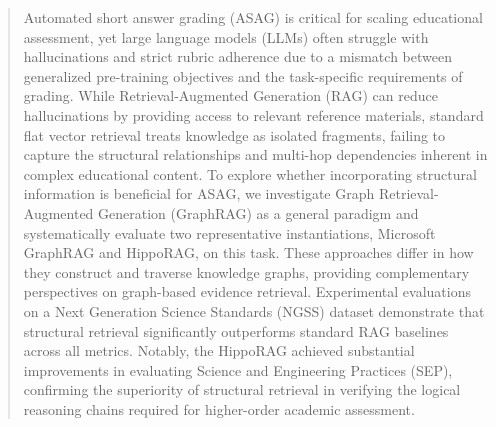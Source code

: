 \documentclass{edm_article}
\begin{document}
\maketitle

\begin{abstract}



Automated short answer grading (ASAG) is critical for scaling educational assessment, yet large language models (LLMs) often struggle with hallucinations and strict rubric adherence due to a mismatch between generalized pre-training objectives and the task-specific requirements of grading. While Retrieval-Augmented Generation (RAG) can reduce hallucinations by providing access to relevant reference materials, standard flat vector retrieval treats knowledge as isolated fragments, failing to capture the structural relationships and multi-hop dependencies inherent in complex educational content. To explore whether incorporating structural information is beneficial for ASAG, we investigate Graph Retrieval-Augmented Generation (GraphRAG) as a general paradigm and systematically evaluate two representative instantiations, Microsoft GraphRAG and HippoRAG, on this task. These approaches differ in how they construct and traverse knowledge graphs, providing complementary perspectives on graph-based evidence retrieval. Experimental evaluations on a Next Generation Science Standards (NGSS) dataset demonstrate that structural retrieval significantly outperforms standard RAG baselines across all metrics. Notably, the HippoRAG achieved substantial improvements in evaluating Science and Engineering Practices (SEP), confirming the superiority of structural retrieval in verifying the logical reasoning chains required for higher-order academic assessment.
\end{abstract}
\end{document}
